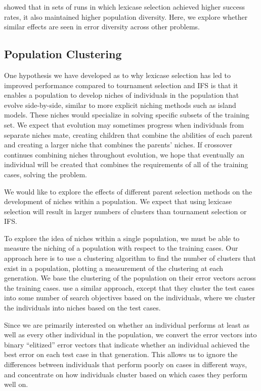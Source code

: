 \cite{Helmuth:2015:ieeeTEC} showed that in sets of runs in which lexicase selection achieved higher success rates, 
it also maintained higher population diversity. Here, we  explore whether similar 
effects are seen in error diversity across other problems.

\subsection{Population Clustering}
\label{sec:clusterCountDef}

One hypothesis we have developed as to why lexicase selection has led to improved performance compared to tournament selection and IFS is that it enables a population to develop niches of individuals in the population that evolve side-by-side, similar to more explicit niching methods such as island models. These niches would specialize in solving specific subsets of the training set. We expect that evolution may sometimes progress when individuals from separate niches mate, creating children that combine the abilities of each parent and creating a larger niche that combines the parents' niches. If crossover continues combining niches throughout evolution, we hope that eventually an individual will be created that combines the requirements of all of the training cases, solving the problem.

We would like to explore the effects of different parent selection methods on the development of niches within a population. We expect that using lexicase selection will result in larger numbers of clusters than tournament selection or IFS.

To explore the idea of niches within a single population, we must be able to measure the niching of a population with respect to the training cases. Our approach here is to use a clustering algorithm to find the number of clusters that exist in a population, plotting a measurement of the clustering at each generation. We base the clustering of the population on their error vectors across the training cases. \cite{Krawiec:2015:EuroGP} use a similar approach, except that they cluster the test cases into some number of search objectives based on the individuals, where we cluster the individuals into niches based on the test cases.


Since we are primarily interested on whether an individual performs at least as well as every other 
individual in the population, we convert the error vectors into binary ``elitized'' error vectors 
that indicate whether an individual achieved the best error on each test case in that generation. 
This allows us to ignore the differences between individuals that perform poorly on cases in different 
ways, and concentrate on how individuals cluster based on which cases they perform well on.

